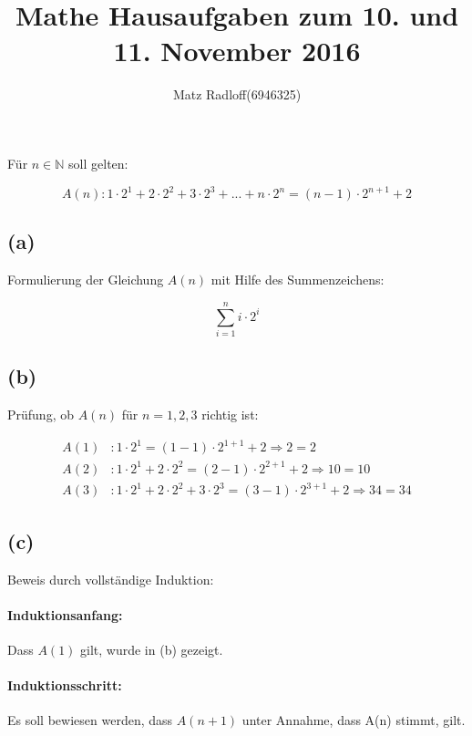 \documentclass[11pt,a4paper]{article}
\title{\textbf{Mathe Hausaufgaben zum 10. und 11. November 2016}}
\author{Matz Radloff(6946325)}
\begin{document}
  \maketitle
  \date{}

\section{}

Für $n \in \mathbb{N}$ soll gelten:

\begin{equation*}
    A(n): 1 \cdot 2^1 + 2 \cdot 2^2 + 3 \cdot 2^3 + ... + n \cdot 2^n = (n-1) \cdot 2^{n+1} + 2
\end{equation*}

\subsection*{(a)} Formulierung der Gleichung $A(n)$ mit Hilfe des Summenzeichens:

\begin{equation*}
    \sum_{i=1}^{n}{i \cdot 2^i}
\end{equation*}

\subsection*{(b)} Prüfung, ob $A(n)$ für $n = 1, 2, 3$ richtig ist:

\begin{align*}
    A(1) &: 1 \cdot 2^1 = (1-1) \cdot 2^{1+1}+2 \Rightarrow 2 = 2 \tag*{\checkmark}\\
    A(2) &: 1 \cdot 2^1 + 2 \cdot 2^2 = (2-1) \cdot 2^{2+1}+2 \Rightarrow 10 = 10 \tag*{\checkmark}\\
    A(3) &: 1 \cdot 2^1 + 2 \cdot 2^2 + 3 \cdot 2^3 = (3-1) \cdot 2^{3+1}+2 \Rightarrow 34 = 34 \tag*{\checkmark}
\end{align*}

\subsection*{(c)} Beweis durch vollständige Induktion:

\paragraph{Induktionsanfang:}
Dass $A(1)$ gilt, wurde in (b) gezeigt.

\paragraph{Induktionsschritt:}
Es soll bewiesen werden, dass $A(n+1)$ unter Annahme, dass A(n) stimmt, gilt.
\end{document}
